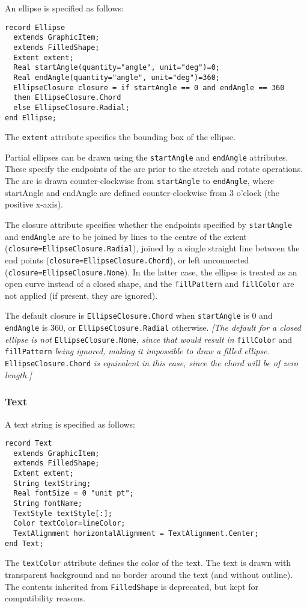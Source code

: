An ellipse is specified as follows:

\begin{lstlisting}[language=modelica]
record Ellipse
  extends GraphicItem;
  extends FilledShape;
  Extent extent;
  Real startAngle(quantity="angle", unit="deg")=0;
  Real endAngle(quantity="angle", unit="deg")=360;
  EllipseClosure closure = if startAngle == 0 and endAngle == 360
  then EllipseClosure.Chord
  else EllipseClosure.Radial;
end Ellipse;
\end{lstlisting}
The \lstinline!extent! attribute specifies the bounding box of the ellipse.

Partial ellipses can be drawn using the \lstinline!startAngle! and \lstinline!endAngle!
attributes. These specify the endpoints of the arc prior to the stretch
and rotate operations. The arc is drawn counter-clockwise from
\lstinline!startAngle! to \lstinline!endAngle!, where startAngle and endAngle are defined
counter-clockwise from 3 o'clock (the positive x-axis).

The closure attribute specifies whether the endpoints specified by
\lstinline!startAngle! and \lstinline!endAngle! are to be joined by lines to the centre of the
extent (\lstinline!closure=EllipseClosure.Radial!), joined by a single straight line
between the end points (\lstinline!closure=EllipseClosure.Chord!), or left
unconnected (\lstinline!closure=EllipseClosure.None!). In the latter case, the
ellipse is treated as an open curve instead of a closed shape, and the
\lstinline!fillPattern! and \lstinline!fillColor! are not applied (if present, they are
ignored).

The default closure is \lstinline!EllipseClosure.Chord! when \lstinline!startAngle! is 0 and
\lstinline!endAngle! is 360, or \lstinline!EllipseClosure.Radial! otherwise.
\emph{{[}The
default for a closed ellipse is not} \lstinline!EllipseClosure.None!\emph{, since that
would result in} \lstinline!fillColor! and \lstinline!fillPattern! \emph{being ignored, making it
impossible to draw a filled ellipse.} \lstinline!EllipseClosure.Chord! \emph{is equivalent
in this case, since the chord will be of zero length.{]}}

\subsubsection{Text}

A text string is specified as follows:

\begin{lstlisting}[language=modelica]
record Text
  extends GraphicItem;
  extends FilledShape;
  Extent extent;
  String textString;
  Real fontSize = 0 "unit pt";
  String fontName;
  TextStyle textStyle[:];
  Color textColor=lineColor;
  TextAlignment horizontalAlignment = TextAlignment.Center;
end Text;
\end{lstlisting}
The \lstinline!textColor! attribute defines the color of the text. The text is drawn
with transparent background and no border around the text (and without
outline). The contents inherited from \lstinline!FilledShape! is deprecated, but kept for compatibility reasons.

